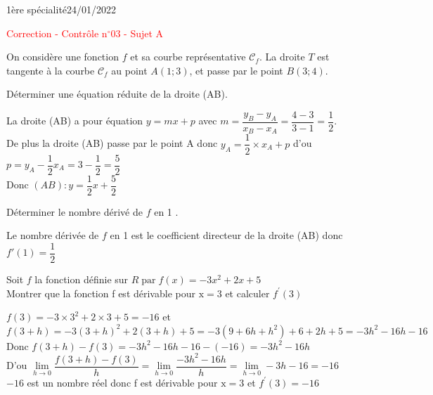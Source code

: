 \documentclass[a5paper,12pt]{article}        %
\begin{document}
\graphicspath{{images/}}
\pagestyle{empty}
\vspace*{-1.5cm}
1ère spécialité\phantom{xxxxxxxxxxxxxxxxxxxxxxxxxxxxxxxxxxxxxxxxxxxxxxxxxxxxxxxxxxxxxxx}24/01/2022
{\begin{center}\Huge{\textcolor{red}{Correction - Contrôle n$^{\circ}$03 - Sujet A}}\end{center}}


On considère une fonction $f$ et sa courbe représentative $\mathscr{C}_{f}$. La droite $T$ est tangente à la courbe $\mathscr{C}_{f}$ au point $A(1 ; 3)$, et passe par le point $B(3 ; 4)$.
\begin{enumMet}
    \item Déterminer une équation réduite de la droite (AB).\\
    \begin{corrBox}
    La droite (AB) a pour équation $y=mx+p$ avec $m=\dfrac{y_B-y_A}{x_B-x_A}=\dfrac{4-3}{3-1}=\dfrac{1}{2}$.\\
    De plus la droite (AB) passe par le point A donc $y_A=\dfrac{1}{2}\times x_A+p$ d'ou $p=y_A-\dfrac{1}{2}x_A=3-\dfrac{1}{2}=\dfrac{5}{2}$\\
    Donc $(AB) : y=\dfrac{1}{2}x+\dfrac{5}{2}$
    \end{corrBox}   
    \item Déterminer le nombre dérivé de $f$ en 1 .\\
    \begin{corrBox}
        Le nombre dérivée de $f$ en 1 est le coefficient directeur de la droite (AB) donc $f'(1)=\dfrac{1}{2}$
    \end{corrBox}
\end{enumMet}


Soit $f$ la fonction définie sur $R \operatorname{par} f(x)=-3 x^2+2x+5$\\
Montrer que la fonction f est dérivable pour $\mathrm{x}=3$ et calculer $f^{\prime}(3)$\\
\begin{corrBox}
    $f(3)=-3\times3^2+2\times3+5=-16$ et\\ $f(3+h)=-3(3+h)^2+2(3+h)+5=-3(9+6h+h^2)+6+2h+5=-3h^2-16h-16$\\
    Donc $f(3+h)-f(3)=-3h^2-16h-16-(-16)=-3h^2-16h$\\
    D'ou $\lim\limits_{h \rightarrow 0} \dfrac{f(3+h)-f(3)}{h}=\lim\limits_{h \rightarrow 0} \dfrac{-3h^2-16h}{h}=\lim\limits_{h \rightarrow 0} -3h-16=-16$\\
    $-16$ est un nombre réel donc f est dérivable pour $\mathrm{x}=3$ et $f^{\prime}(3)=-16$
\end{corrBox}
\end{document}
